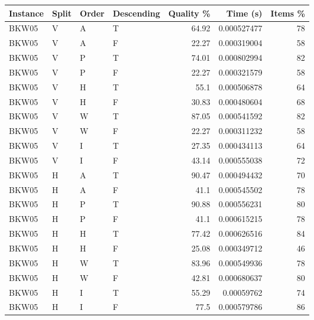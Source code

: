\begin{tabular}{llllrrr}
    \hline
    Instance & Split & Order & Descending & Quality \% & Time (s)    & Items \% \\
    \hline
    BKW05    & V     & A     & T          & 64.92      & 0.000527477 & 78       \\
    BKW05    & V     & A     & F          & 22.27      & 0.000319004 & 58       \\
    BKW05    & V     & P     & T          & 74.01      & 0.000802994 & 82       \\
    BKW05    & V     & P     & F          & 22.27      & 0.000321579 & 58       \\
    BKW05    & V     & H     & T          & 55.1       & 0.000506878 & 64       \\
    BKW05    & V     & H     & F          & 30.83      & 0.000480604 & 68       \\
    BKW05    & V     & W     & T          & 87.05      & 0.000541592 & 82       \\
    BKW05    & V     & W     & F          & 22.27      & 0.000311232 & 58       \\
    BKW05    & V     & I     & T          & 27.35      & 0.000434113 & 64       \\
    BKW05    & V     & I     & F          & 43.14      & 0.000555038 & 72       \\
    BKW05    & H     & A     & T          & 90.47      & 0.000494432 & 70       \\
    BKW05    & H     & A     & F          & 41.1       & 0.000545502 & 78       \\
    BKW05    & H     & P     & T          & 90.88      & 0.000556231 & 80       \\
    BKW05    & H     & P     & F          & 41.1       & 0.000615215 & 78       \\
    BKW05    & H     & H     & T          & 77.42      & 0.000626516 & 84       \\
    BKW05    & H     & H     & F          & 25.08      & 0.000349712 & 46       \\
    BKW05    & H     & W     & T          & 83.96      & 0.000549936 & 78       \\
    BKW05    & H     & W     & F          & 42.81      & 0.000680637 & 80       \\
    BKW05    & H     & I     & T          & 55.29      & 0.00059762  & 74       \\
    BKW05    & H     & I     & F          & 77.5       & 0.000579786 & 86       \\

\end{tabular}
